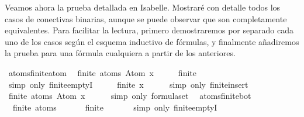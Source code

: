 \begin{isabellebody}
\begin{isamarkuptext}
  Veamos ahora la prueba detallada en Isabelle. Mostraré con detalle 
  todos los casos de conectivas binarias, aunque se puede observar que 
  son completamente equivalentes. Para facilitar la lectura, primero 
  demostraremos por separado cada uno de los casos según el esquema 
  inductivo de fórmulas, y finalmente añadiremos la prueba para una 
  fórmula cualquiera a partir de los anteriores.%
\end{isamarkuptext}\isamarkuptrue%
\isamarkupfalse%
\ atoms{\isacharunderscore}finite{\isacharunderscore}atom{\isacharcolon}\isanewline
\ \ {\isachardoublequoteopen}finite\ {\isacharparenleft}atoms\ {\isacharparenleft}Atom\ x{\isacharparenright}{\isacharparenright}{\isachardoublequoteclose}\isanewline
%
\isadelimproof
%
\endisadelimproof
%
\isatagproof
{}\isamarkupfalse%
\ {\isacharminus}\isanewline
\ \ \isamarkupfalse%
\ {\isachardoublequoteopen}finite\ {\isasymemptyset}{\isachardoublequoteclose}\isanewline
\ \ \ \ \isamarkupfalse%
\ {\isacharparenleft}simp\ only{\isacharcolon}\ finite{\isachardot}emptyI{\isacharparenright}\isanewline
\ \ \isamarkupfalse%
\ \isamarkupfalse%
\ {\isachardoublequoteopen}finite\ {\isacharbraceleft}x{\isacharbraceright}{\isachardoublequoteclose}\isanewline
\ \ \ \ \isamarkupfalse%
\ {\isacharparenleft}simp\ only{\isacharcolon}\ finite{\isacharunderscore}insert{\isacharparenright}\isanewline
\ \ \isamarkupfalse%
\ \isamarkupfalse%
\ {\isachardoublequoteopen}finite\ {\isacharparenleft}atoms\ {\isacharparenleft}Atom\ x{\isacharparenright}{\isacharparenright}{\isachardoublequoteclose}\isanewline
\ \ \ \ \isamarkupfalse%
\ {\isacharparenleft}simp\ only{\isacharcolon}\ formula{\isachardot}set{\isacharparenleft}{}{\isacharparenright}{\isacharparenright}\ \isanewline
{}\isamarkupfalse%
%
\endisatagproof
{\isafoldproof}%
%
\isadelimproof
\isanewline
%
\endisadelimproof
\isanewline
{}\isamarkupfalse%
\ atoms{\isacharunderscore}finite{\isacharunderscore}bot{\isacharcolon}\isanewline
\ \ {\isachardoublequoteopen}finite\ {\isacharparenleft}atoms\ {\isasymbottom}{\isacharparenright}{\isachardoublequoteclose}\isanewline
%
\isadelimproof
%
\endisadelimproof
%
\isatagproof
{}\isamarkupfalse%
\ {\isacharminus}\isanewline
\ \ \isamarkupfalse%
\ {\isachardoublequoteopen}finite\ {\isasymemptyset}{\isachardoublequoteclose}\isanewline
\ \ \ \ \isamarkupfalse%
\ {\isacharparenleft}simp\ only{\isacharcolon}\ finite{\isachardot}emptyI{\isacharparenright}\isanewline

\end{isabellebody}
